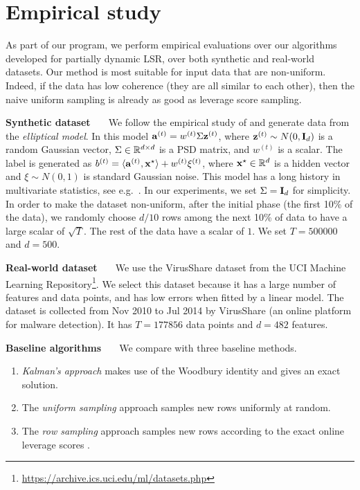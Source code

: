 \section{Empirical study}
\label{sec:exp}


As part of our program, we perform empirical evaluations over our algorithms developed for partially dynamic LSR, over both synthetic and real-world datasets. 
Our method is most suitable for input data that are non-uniform. 
Indeed, if the data has low coherence (they are all similar to each other), then the naive uniform sampling is already as good as leverage score sampling. 


\vspace{+2mm}
{\noindent \bf Synthetic dataset \ \ } We follow the empirical study of \cite{dl19} and generate data from the {\em elliptical model}. In this model $\mathbf{a}^{(t)} = w^{(t)}\Sigma \mathbf{z}^{(t)}$, where $\mathbf{z}^{(t)} \sim N(0, \mathbf{I}_d)$ is a random Gaussian vector, $\Sigma \in \mathbb{R}^{d\times d}$ is a PSD matrix, and $w^{(t)}$ is a scalar. The label is generated as $b^{(t)} = \langle \mathbf{a}^{(t)}, \mathbf{x}^{\star}\rangle + w^{(t)}\xi^{(t)}$, where $\mathbf{x}^{\star} \in \mathbb{R}^{d}$ is a hidden vector and $\xi \sim N(0,1)$ is standard Gaussian noise. This model has a long history in multivariate statistics, see e.g.~\cite{martin1979multivariate}. 
In our experiments, we set $\Sigma = \mathbf{I}_d$ for simplicity. 
In order to make the dataset non-uniform, after the initial phase (the first 10\% of the data), we randomly choose $d/10$ rows among the next 10\% of data to have a large scalar of $\sqrt{T}$. The rest of the data have a scalar of $1$. 
We set $T = 500000$ and $d = 500$.



\vspace{+2mm}
{\noindent \bf Real-world dataset \ \ } We use the VirusShare dataset from the UCI Machine Learning Repository\footnote{\url{https://archive.ics.uci.edu/ml/datasets.php}}. We select this dataset because it has a large number of features and data points, and has low errors when fitted by a linear model. 
The dataset is collected from Nov 2010 to Jul 2014 by VirusShare (an online platform for malware detection).
It has $T = 177856$ data points and $d = 482$ features.


\vspace{+2mm}
{\noindent \bf Baseline algorithms \ \ } We compare with three baseline methods. 
\begin{enumerate}
\item {\em Kalman's approach} makes use of the Woodbury identity and gives an exact solution. 
\item The {\em uniform sampling} approach samples new rows uniformly at random. 
\item The {\em row sampling} approach samples new rows according to the exact online leverage scores \cite{cmp20}.
\end{enumerate}


